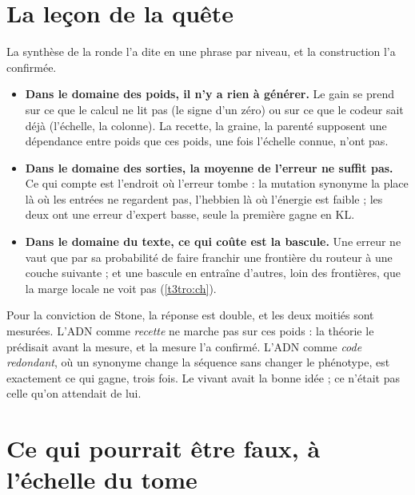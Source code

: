\section{La leçon de la quête}\label{t3dis:sec:lecon}

La synthèse de la ronde l'a dite en une phrase par niveau, et la construction l'a confirmée.
\begin{itemize}
\item \textbf{Dans le domaine des poids, il n'y a rien à générer.} Le gain se prend sur ce que le calcul ne lit pas (le signe d'un zéro) ou sur ce que le codeur sait déjà (l'échelle, la colonne). La recette, la graine, la parenté supposent une dépendance entre poids que ces poids, une fois l'échelle connue, n'ont pas.
\item \textbf{Dans le domaine des sorties, la moyenne de l'erreur ne suffit pas.} Ce qui compte est l'endroit où l'erreur tombe : la mutation synonyme la place là où les entrées ne regardent pas, l'hebbien là où l'énergie est faible ; les deux ont une erreur d'expert basse, seule la première gagne en KL.
\item \textbf{Dans le domaine du texte, ce qui coûte est la bascule.} Une erreur ne vaut que par sa probabilité de faire franchir une frontière du routeur à une couche suivante ; et une bascule en entraîne d'autres, loin des frontières, que la marge locale ne voit pas (\cref{t3tro:ch}).
\end{itemize}
Pour la conviction de Stone, la réponse est double, et les deux moitiés sont mesurées. L'ADN comme \emph{recette} ne marche pas sur ces poids : la théorie le prédisait avant la mesure, et la mesure l'a confirmé. L'ADN comme \emph{code redondant}, où un synonyme change la séquence sans changer le phénotype, est exactement ce qui gagne, trois fois. Le vivant avait la bonne idée ; ce n'était pas celle qu'on attendait de lui.

\section{Ce qui pourrait être faux, à l'échelle du tome}\label{t3dis:sec:faux}

